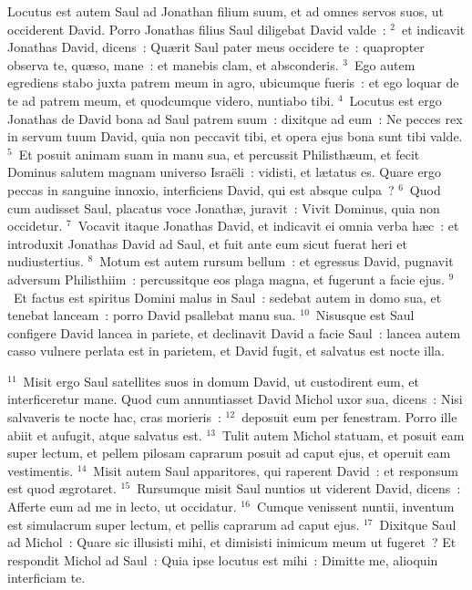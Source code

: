 \lettrine[lines=10,image=true,loversize=0.05,lraise=-0.03]{L}{}ocutus est autem Saul ad Jonathan filium suum, et ad omnes servos suos, ut occiderent David. Porro Jonathas filius Saul diligebat David valde~:
${}^{2}$~et indicavit Jonathas David, dicens~: Qu\ae rit Saul pater meus occidere te~: quapropter observa te, qu\ae so, mane~: et manebis clam, et absconderis.
${}^{3}$~Ego autem egrediens stabo juxta patrem meum in agro, ubicumque fueris~: et ego loquar de te ad patrem meum, et quodcumque videro, nuntiabo tibi.
${}^{4}$~Locutus est ergo Jonathas de David bona ad Saul patrem suum~: dixitque ad eum~: Ne pecces rex in servum tuum David, quia non peccavit tibi, et opera ejus bona sunt tibi valde.
${}^{5}$~Et posuit animam suam in manu sua, et percussit Philisth\ae um, et fecit Dominus salutem magnam universo Isra\"eli~: vidisti, et l\ae tatus es. Quare ergo peccas in sanguine innoxio, interficiens David, qui est absque culpa~?
${}^{6}$~Quod cum audisset Saul, placatus voce Jonath\ae , juravit~: Vivit Dominus, quia non occidetur.
${}^{7}$~Vocavit itaque Jonathas David, et indicavit ei omnia verba h\ae c~: et introduxit Jonathas David ad Saul, et fuit ante eum sicut fuerat heri et nudiustertius.
${}^{8}$~Motum est autem rursum bellum~: et egressus David, pugnavit adversum Philisthiim~: percussitque eos plaga magna, et fugerunt a facie ejus.
${}^{9}$~Et factus est spiritus Domini malus in Saul~: sedebat autem in domo sua, et tenebat lanceam~: porro David psallebat manu sua.
${}^{10}$~Nisusque est Saul configere David lancea in pariete, et declinavit David a facie Saul~: lancea autem casso vulnere perlata est in parietem, et David fugit, et salvatus est nocte illa.


${}^{11}$~Misit ergo Saul satellites suos in domum David, ut custodirent eum, et interficeretur mane. Quod cum annuntiasset David Michol uxor sua, dicens~: Nisi salvaveris te nocte hac, cras morieris~:
${}^{12}$~deposuit eum per fenestram. Porro ille abiit et aufugit, atque salvatus est.
${}^{13}$~Tulit autem Michol statuam, et posuit eam super lectum, et pellem pilosam caprarum posuit ad caput ejus, et operuit eam vestimentis.
${}^{14}$~Misit autem Saul apparitores, qui raperent David~: et responsum est quod \ae grotaret.
${}^{15}$~Rursumque misit Saul nuntios ut viderent David, dicens~: Afferte eum ad me in lecto, ut occidatur.
${}^{16}$~Cumque venissent nuntii, inventum est simulacrum super lectum, et pellis caprarum ad caput ejus.
${}^{17}$~Dixitque Saul ad Michol~: Quare sic illusisti mihi, et dimisisti inimicum meum ut fugeret~? Et respondit Michol ad Saul~: Quia ipse locutus est mihi~: Dimitte me, alioquin interficiam te.


